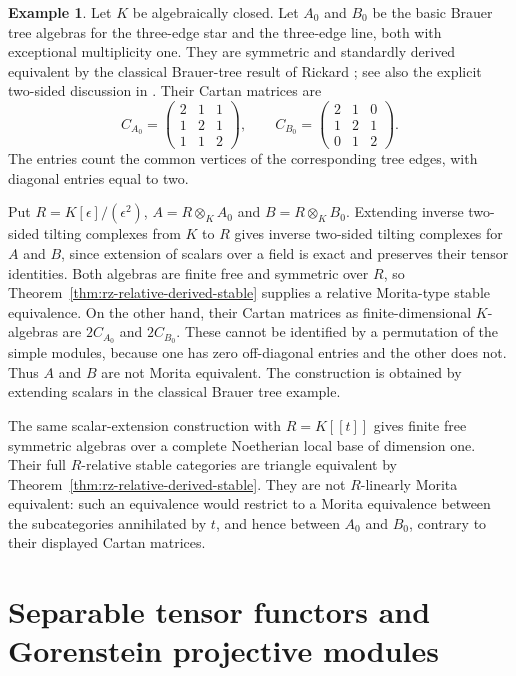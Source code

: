 \documentclass[12pt,a4paper,english,reqno]{amsart}
\numberwithin{equation}{section}
\theoremstyle{plain}
\theoremstyle{definition}
\newtheorem{example}[theorem]{Example}
\begin{document}
\begin{example}\label{ex:relative-brauer-tree}
Let $K$ be algebraically closed.  Let $A_0$ and $B_0$ be the
basic Brauer tree algebras for the three-edge star and the
three-edge line, both with exceptional multiplicity one.
They are symmetric and standardly derived equivalent by the
classical Brauer-tree result of Rickard
\cite[Theorem~4.2]{RickardDerived1989}; see also the explicit
two-sided discussion in \cite[Sections~2.1--2.2]{Kozakai2019}.
Their Cartan matrices are
\[
 C_{A_0}=\begin{pmatrix}2&1&1\\1&2&1\\1&1&2\end{pmatrix},
 \qquad
 C_{B_0}=\begin{pmatrix}2&1&0\\1&2&1\\0&1&2\end{pmatrix}.
\]
The entries count the common vertices of the corresponding tree
edges, with diagonal entries equal to two.

Put $R=K[\epsilon]/(\epsilon^2)$,
$A=R\otimes_KA_0$ and $B=R\otimes_KB_0$.  Extending inverse
two-sided tilting complexes from $K$ to $R$ gives inverse
two-sided tilting complexes for $A$ and $B$, since extension
of scalars over a field is exact and preserves their tensor
identities.  Both algebras are finite free and symmetric over
$R$, so Theorem~\ref{thm:rz-relative-derived-stable} supplies
a relative Morita-type stable equivalence.
On the other hand, their Cartan matrices as finite-dimensional
$K$-algebras are $2C_{A_0}$ and $2C_{B_0}$.  These cannot be
identified by a permutation of the simple modules, because
one has zero off-diagonal entries and the other does not.
Thus $A$ and $B$ are not Morita equivalent.  The construction is
obtained by extending scalars in the classical Brauer tree example.

The same scalar-extension construction with $R=K[[t]]$ gives
finite free symmetric algebras over a complete Noetherian local
base of dimension one.  Their full $R$-relative stable
categories are triangle equivalent by
Theorem~\ref{thm:rz-relative-derived-stable}.  They are not
$R$-linearly Morita equivalent: such an equivalence would
restrict to a Morita equivalence between the subcategories
annihilated by $t$, and hence between $A_0$ and $B_0$, contrary
to their displayed Cartan matrices.
\end{example}

\section{Separable tensor functors and Gorenstein projective modules}
\label{sec:separable-boundary}
\end{document}
